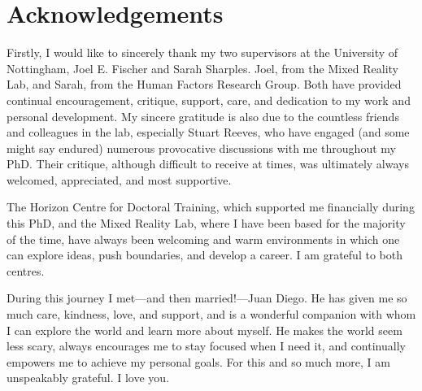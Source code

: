 


%
%
%
%
\chapter*{Acknowledgements}

Firstly, I would like to sincerely thank my two supervisors at the University of Nottingham, Joel E. Fischer and Sarah Sharples. Joel, from the Mixed Reality Lab, and Sarah, from the Human Factors Research Group.
Both have provided continual encouragement, critique, support, care, and dedication to my work and personal development.
My sincere gratitude is also due to the countless friends and colleagues in the lab, especially Stuart Reeves, who have engaged (and some might say endured) numerous provocative discussions with me throughout my PhD.
Their critique, although difficult to receive at times, was ultimately always welcomed, appreciated, and most supportive.

The Horizon Centre for Doctoral Training, which supported me financially during this PhD, and the Mixed Reality Lab, where I have been based for the majority of the time, have always been welcoming and warm environments in which one can explore ideas, push boundaries, and develop a career.
I am grateful to both centres.

During this journey I met---and then married!---Juan Diego.
He has given me so much care, kindness, love, and support, and is a wonderful companion with whom I can explore the world and learn more about myself.
He makes the world seem less scary, always encourages me to stay focused when I need it, and continually empowers me to achieve my personal goals.
For this and so much more, I am unspeakably grateful. I love you.

